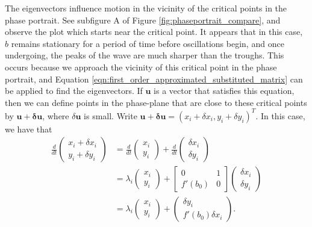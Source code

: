 \documentclass{report}
\begin{document}
The eigenvectors influence motion in the vicinity of the critical points in the phase portrait.
See subfigure A of Figure \ref{fig:phaseportrait_compare}, and observe the plot which starts near the critical point.
It appears that in this case, $b$ remains stationary for a period of time before oscillations begin,
and once undergoing, the peaks of the wave are much sharper than the troughs.
This occurs because we approach the vicinity of this critical point in the phase portrait,
and Equation \ref{eqn:first_order_approximated_substituted_matrix} can be applied to find the eigenvectors.
If $\mathbf{u}$ is a vector that satisfies this equation,
then we can define points in the phase-plane that are close to these critical points by $\mathbf{u} + \mathbf{\delta u}$,
where $\delta\mathbf{u}$ is small.
Write $\mathbf{u + \delta u} = (x_i + \delta x_i, y_i + \delta y_i)^T$.
In this case, we have that
\begin{equation}
\begin{aligned}
    \frac{d}{dt} \begin{pmatrix}
        x_i + \delta x_i\\
        y_i + \delta y_i
    \end{pmatrix} &= \frac{d}{dt}\begin{pmatrix}
        x_i \\
        y_i
    \end{pmatrix} + \frac{d}{dt}\begin{pmatrix}
        \delta x_i \\
        \delta y_i
    \end{pmatrix} \\
    &= \lambda_i \begin{pmatrix}
        x_i \\
        y_i
    \end{pmatrix} + \begin{bmatrix}
        0 & 1 \\
        f'(b_0) & 0
    \end{bmatrix} \begin{pmatrix} %
        \delta x_i \\
        \delta y_i
    \end{pmatrix} \\
    &= \lambda_i \begin{pmatrix}
        x_i \\
        y_i
    \end{pmatrix} + \begin{pmatrix}
        \delta y_i \\
        f'(b_0) \delta x_i
    \end{pmatrix}.
    \label{eqn:matrix_eigenvectors_vicinity} %
\end{aligned}
\end{equation}
\end{document}
